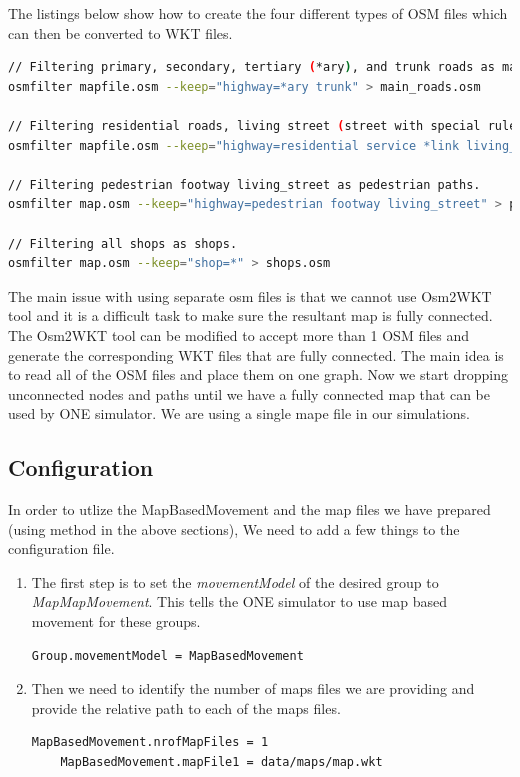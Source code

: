 The listings below show how to create the four different types of OSM files which can then be converted to WKT files.
\vspace{5mm}
\begin{lstlisting}[language=bash]
// Filtering primary, secondary, tertiary (*ary), and trunk roads as main roads.
osmfilter mapfile.osm --keep="highway=*ary trunk" > main_roads.osm

// Filtering residential roads, living street (street with special rules), service and link roads as the common roads
osmfilter mapfile.osm --keep="highway=residential service *link living_street" > roads.osm

// Filtering pedestrian footway living_street as pedestrian paths.
osmfilter map.osm --keep="highway=pedestrian footway living_street" > pedestrian_paths.osm

// Filtering all shops as shops.
osmfilter map.osm --keep="shop=*" > shops.osm
\end{lstlisting}
\vspace{5mm}

The main issue with using separate osm files is that we cannot use Osm2WKT tool \cite{mayer2010osm} and it is a difficult task to make sure the resultant map is fully connected. The Osm2WKT tool \cite{mayer2010osm} can be modified to accept more than 1 OSM files and generate the corresponding WKT files that are fully connected. The main idea is to read all of the OSM files and place them on one graph. Now we start dropping unconnected nodes and paths until we have a fully connected map that can be used by ONE simulator. We are using a single mape file in our simulations.

\subsection{Configuration}
In order to utlize the MapBasedMovement and the map files we have prepared (using method in the above sections), We need to add a few things to the configuration file.

\begin{enumerate}
	\item The first step is to set the \textit{movementModel} of the desired group to \textit{MapMapMovement}. This tells the ONE simulator to use map based movement for these groups.
	\begin{lstlisting}[language=bash]
	Group.movementModel = MapBasedMovement
	\end{lstlisting}
	\item Then we need to identify the number of maps files we are providing and provide the relative path to each of the maps files.
	\begin{lstlisting}[language=bash]
	MapBasedMovement.nrofMapFiles = 1
	MapBasedMovement.mapFile1 = data/maps/map.wkt
	\end{lstlisting}
\end{enumerate}

